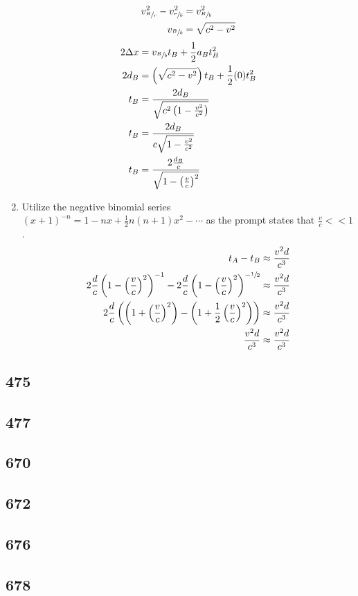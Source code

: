 \documentclass{article}
\begin{document}
\begin{enumerate}[label=\textbf{(\alph*)}]
		\begin{align*}
			v_{\sfrac{B}{r}}^2 - v_{\sfrac{r}{b}}^2 & = v_{\sfrac{B}{b}}^2 \\
			v_{\sfrac{B}{b}} & = \sqrt{c^2 - v^2}
		\end{align*}
		\begin{align*}
			2\Delta x & = v_{\sfrac{B}{b}}t_B + \frac{1}{2}a_Bt_B^2 \\
			2d_B & = \left( \sqrt{c^2 - v^2} \right) t_B + \frac{1}{2}(0)t_B^2 \\
			t_B & = \frac{2d_B}{\sqrt{c^2 \left( 1 - \frac{v^2}{c^2} \right) }} \\
			t_B & = \frac{2d_B}{c\sqrt{1 - \frac{v^2}{c^2}}} \\
			t_B & = \frac{ 2\frac{d_B}{c} }{ \sqrt{1 - \left( \frac{v}{c} \right)^2} }
		\end{align*}
	\item
		Utilize the negative binomial series $ (x + 1)^{-n} = 1 - nx + \frac{1}{2}n(n + 1)x^2 - \cdots $ as the prompt states that $ \frac{v}{c} << 1 $.
		\begin{align*}
			t_A - t_B & \approx \frac{v^2d}{c^3} \\
			2\frac{d}{c} \left( 1 - \left( \frac{v}{c} \right)^2 \right)^{-1} - 2\frac{d}{c} \left( 1 - \left( \frac{v}{c} \right)^2 \right)^{-\sfrac{1}{2}} & \approx \frac{v^2d}{c^3} \\
			2\frac{d}{c} \left( \left( 1 + \left( \frac{v}{c} \right)^2 \right) - \left( 1 + \frac{1}{2} \left( \frac{v}{c} \right)^2 \right) \right) & \approx \frac{v^2d}{c^3} \\
			\frac{v^2d}{c^3} & \approx \frac{v^2d}{c^3}
		\end{align*}
\end{enumerate}

\subsection{475}

\subsection{477}

\subsection{670}

\subsection{672}

\subsection{676}

\subsection{678}
\end{document}
